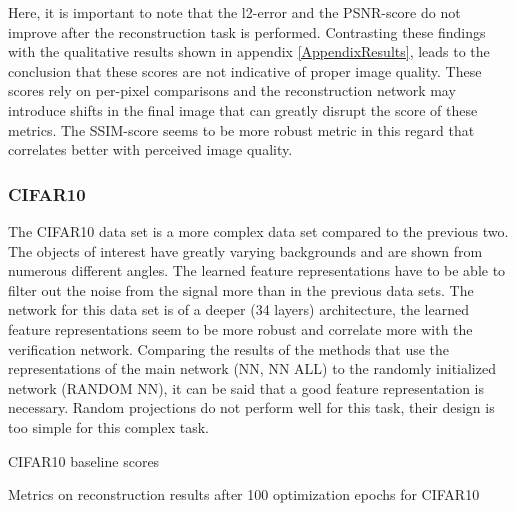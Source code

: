 Here, it is important to note that the l2-error and the PSNR-score do not improve after the reconstruction task is performed.
Contrasting these findings with the qualitative results shown in appendix \ref{AppendixResults}, 
leads to the conclusion that these scores are not indicative of proper image quality.
These scores rely on per-pixel comparisons and the reconstruction network may introduce shifts in the final image
that can greatly disrupt the score of these metrics.
The SSIM-score seems to be more robust metric in this regard that correlates better with perceived image quality.





\subsubsection{CIFAR10}

The CIFAR10 data set is a more complex data set compared to the previous two.
The objects of interest have greatly varying backgrounds and are shown from numerous different angles.
The learned feature representations have to be able to filter out the noise from the signal more than in
the previous data sets.
The network for this data set is of a deeper (34 layers) architecture,
the learned feature representations seem to be more robust and correlate more with the verification network.
Comparing the results of the methods that use the representations of the main network (NN, NN ALL)
to the randomly initialized network (RANDOM NN), it can be said that a good feature representation is necessary.
Random projections do not perform well for this task, their design is too simple for this complex task.

\begin{table}[!htbp]
\label{tab:cifar10baseline}
\centering
\footnotesize
{}
\caption{CIFAR10 baseline scores}
\end{table}

\begin{table}[!htbp]
\label{tab:cifar10results}
\centering
\footnotesize
{}
\caption{Metrics on reconstruction results after 100 optimization epochs for CIFAR10}
\end{table}






